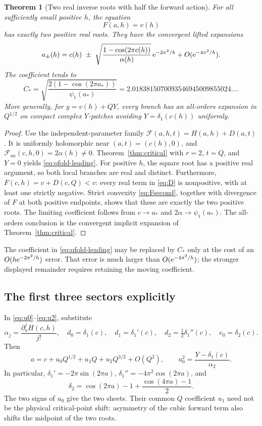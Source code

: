 \documentclass[11pt,a4paper]{article}
\numberwithin{equation}{section}
\newtheorem{theorem}{Theorem}[section]
\theoremstyle{definition}
\theoremstyle{remark}\newtheorem{remark}[theorem]{Remark}
\begin{document}
\begin{theorem}[Two real inverse roots with half the forward action]
\label{thm:qfold}
For all sufficiently small positive $h$, the equation
\begin{equation}\label{eq:physical-level}
 F(a,h)=v(h)
\end{equation}
has exactly two positive real roots. They have the convergent lifted
expansions
\begin{equation}\label{eq:qfold-leading}
 a_\pm(h)=c(h)\ \pm\
 \sqrt{\frac{1-\cos(2\pi c(h))}{\alpha(h)}}\,
     \mathrm e^{-2\pi^2/h}+O(\mathrm e^{-4\pi^2/h}).
\end{equation}
The coefficient tends to
\begin{equation}\label{eq:Cstar}
 C_*=
 \sqrt{\frac{2(1-\cos(2\pi a_*))}{\psi_1(a_*)}}
 =2.0183815070093546945009855024\ldots.
\end{equation}
More generally, for $y=v(h)+QY$, every branch has an all-orders
expansion in $Q^{1/2}$ on compact complex $Y$-patches avoiding
$Y=\delta_1(c(h))$ uniformly.
\end{theorem}
\begin{proof}
Use the independent-parameter family
$\mathcal F(a,h,t)=H(a,h)+D(a,t)$. It is uniformly holomorphic near
$(a,t)=(c(h),0)$, and $\mathcal F_{aa}(c,h,0)=2\alpha(h)\ne0$.
Theorem~\ref{thm:critical} with $r=2$, $t=Q$, and $Y=0$ yields
\eqref{eq:qfold-leading}. For positive $h$, the square root has a
positive real argument, so both local branches are real and distinct.
Furthermore, $F(c,h)=v+D(c,Q)<v$: every real term in
\eqref{eq:D} is nonpositive, with at least one strictly negative.
Strict convexity \eqref{eq:Fsecond}, together with divergence of $F$
at both positive endpoints, shows that these are exactly the two
positive roots. The limiting coefficient follows from
$c\to a_*$ and $2\alpha\to\psi_1(a_*)$. The all-orders conclusion is
the convergent implicit expansion of Theorem~\ref{thm:critical}.
\end{proof}
The coefficient in \eqref{eq:qfold-leading} may be replaced by $C_*$
only at the cost of an $O(h\mathrm e^{-2\pi^2/h})$ error. That error is much
larger than $O(\mathrm e^{-4\pi^2/h})$; the stronger displayed remainder
requires retaining the moving coefficient.

\subsection{The first three sectors explicitly}
In \eqref{eq:u0}--\eqref{eq:u2}, substitute
\[
 \alpha_j=\frac{\partial_a^jH(c,h)}{j!},\quad
 d_0=\delta_1(c),\quad d_1=\delta_1'(c),\quad
 d_2=\tfrac12\delta_1''(c),\quad e_0=\delta_2(c).
\]
Then
\begin{equation}\label{eq:qfold-three}
 a=c+u_0Q^{1/2}+u_1Q+u_2Q^{3/2}+O(Q^2),
 \qquad u_0^2=\frac{Y-\delta_1(c)}{\alpha_2}.
\end{equation}
In particular,
$\delta_1'=-2\pi\sin(2\pi a)$,
$\delta_1''=-4\pi^2\cos(2\pi a)$, and
\[
 \delta_2=\cos(2\pi a)-1+\frac{\cos(4\pi a)-1}{2}.
\]
The two signs of $u_0$ give the two sheets. Their common $Q$ coefficient
$u_1$ need not be the physical critical-point shift: asymmetry of the
cubic forward term also shifts the midpoint of the two roots.
\end{document}
